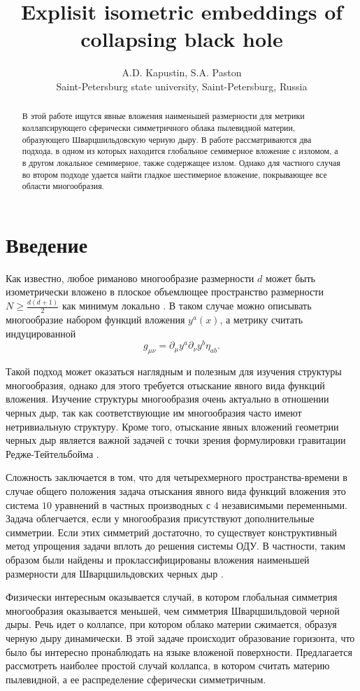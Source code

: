 \documentclass[12pt]{article}
\title{Explisit isometric embeddings of collapsing black hole}
\author{A.D. Kapustin, S.A. Paston \\ Saint-Petersburg state university, Saint-Petersburg, Russia}
\date{}
\newcommand{\bq}{\begin{equation}}
\newcommand{\eq}{\end{equation}}
\begin{document}
\maketitle
\begin{abstract}
В этой работе ищутся явные вложения наименьшей размерности для метрики коллапсирующего сферически симметричного облака пылевидной материи, образующего Шварцшильдовскую черную дыру. В работе рассматриваются два подхода, в одном из которых находится глобальное семимерное вложение с изломом, а в другом локальное семимерное, также содержащее излом. Однако для частного случая во втором подходе удается найти гладкое шестимерное вложение, покрывающее все области многообразия.
\end{abstract}

\clearpage

\section{Введение}
Как известно, любое риманово многообразие размерности $d$ может быть изометрически вложено в плоское объемлющее пространство размерности $N \geqslant \frac{d(d+1)}{2}$ как минимум локально \cite{gane, kart, fridman61}. В таком случае можно описывать многообразие набором функций вложения $y^a(x)$, а метрику считать индуцированной
\bq
	g_{\mu \nu} = \partial_{\mu} y^a \partial_{\nu} y^b \eta_{ab}.
\eq

Такой подход может оказаться наглядным и полезным для изучения структуры многообразия, однако для этого требуется отыскание явного вида функций вложения. Изучение структуры многообразия очень актуально в отношении черных дыр, так как соответствующие им многообразия часто имеют нетривиальную структуру. Кроме того, отыскание явных вложений геометрии черных дыр является важной задачей с точки зрения формулировки гравитации Редже-Тейтельбойма \cite{regge}.

Сложность заключается в том, что для четырехмерного пространства-времени в случае общего положения задача отыскания явного вида функций вложения это система $10$ уравнений в частных производных с $4$ независимыми переменными. Задача облегчается, если у многообразия присутствуют дополнительные симметрии. Если этих симметрий достаточно, то существует конструктивный метод упрощения задачи вплоть до решения системы ОДУ. В частности, таким образом были найдены и проклассифицированы вложения наименьшей размерности для Шварцшильдовских черных дыр \cite{statja27}.  

Физически интересным оказывается случай, в котором глобальная симметрия многообразия оказывается меньшей, чем симметрия Шварцшильдовой черной дыры. Речь идет о коллапсе, при котором облако материи сжимается, образуя черную дыру динамически. В этой задаче происходит образование горизонта, что было бы интересно пронаблюдать на языке вложеной поверхности. Предлагается рассмотреть наиболее простой случай коллапса, в котором считать материю пылевидной, а ее распределение сферически симметричным.
\end{document}
